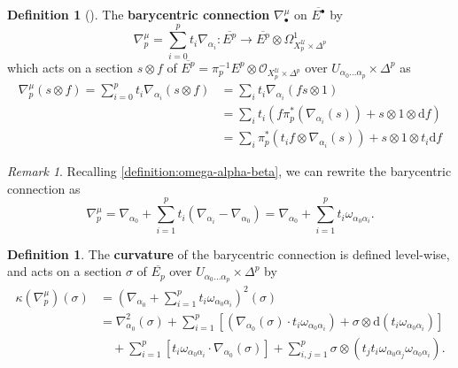 \documentclass[11pt,fleqn]{article}
\theoremstyle{plain}
\theoremstyle{definition}
\newtheorem{definition}[theorem]{Definition}
\theoremstyle{remark}
\newtheorem{remark}[theorem]{Remark}
\numberwithin{equation}{theorem}
\newcommand{\cover}{\mathcal{U}}
\newcommand{\OO}{\mathcal{O}}
\newcommand{\define}[1]{\textbf{#1}}
\newcommand{\nerve}[1]{X_{#1}^\cover}
\renewcommand{\d}{\mathrm{d}}
\begin{document}
        \begin{definition}[{\cite[34]{Green1980}}]
            The \define{barycentric connection} $\nabla_\bullet^\mu$ on $\overline{E^\bullet}$ by
            \[
                \nabla_p^\mu
                =
                \sum_{i=0}^p t_i\nabla_{\alpha_i}
                \colon
                \overline{E^p}
                \to
                \overline{E^p}\otimes\Omega_{\nerve{p}\times\Delta^p}^1
            \]
            which acts on a section $s\otimes f$ of $\overline{E^p}=\pi_p^{-1}E^p\otimes\OO_{\nerve{p}\times\Delta^p}$ over $U_{\alpha_0\ldots\alpha_p}\times\Delta^p$ as
            \begin{align*}
                \nabla_p^\mu(s\otimes f)
                = \sum_{i=0}^p t_i\nabla_{\alpha_i}(s\otimes f)
                &= \sum_i t_i\nabla_{\alpha_i}( f s\otimes1)
            \\  &= \sum_i t_i\left( f\pi_p^*\left(\nabla_{\alpha_i}(s)\right)+s\otimes1\otimes\d f\right)
            \\  &= \sum_i \pi_p^*\left(t_i f\otimes\nabla_{\alpha_i}(s)\right)+s\otimes1\otimes t_i\d f
            \end{align*}
        \end{definition}

        \begin{remark}
            Recalling \cref{definition:omega-alpha-beta}, we can rewrite the barycentric connection as
            \[
                \nabla_p^\mu
                =
                \nabla_{\alpha_0} + \sum_{i=1}^p t_i \left(
                    \nabla_{\alpha_i} - \nabla_{\alpha_0}
                \right)
                =
                \nabla_{\alpha_0} + \sum_{i=1}^p t_i \omega_{\alpha_0\alpha_i}.
            \]
        \end{remark}

        \begin{definition}
            The \define{curvature} of the barycentric connection is defined level-wise, and acts on a section $\sigma$ of $\overline{E_p}$ over $U_{\alpha_0\ldots\alpha_p}\times\Delta^p$ by
            \begin{align*}
                \kappa\left(\nabla_p^\mu\right)(\sigma)
                &= \left(\nabla_{\alpha_0}+\sum_{i=1}^p t_i\omega_{\alpha_0\alpha_i}\right)^2\left(\sigma\right)
            \\  &= \nabla_{\alpha_0}^2\left(\sigma\right) + \sum_{i=1}^p\left[\left(\nabla_{\alpha_0}\left(\sigma\right)\cdot t_i\omega_{\alpha_0\alpha_i}\right)+\sigma\otimes\d(t_i\omega_{\alpha_0\alpha_i})\right]
            \\  & \quad+\sum_{i=1}^p\left[t_i\omega_{\alpha_0\alpha_i}\cdot\nabla_{\alpha_0}\left(\sigma\right)\right] + \sum_{i,j=1}^p\sigma\otimes\left(t_jt_i\omega_{\alpha_0\alpha_j}\omega_{\alpha_0\alpha_i}\right).
            \end{align*}
        \end{definition}
\end{document}
